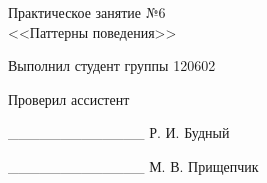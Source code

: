 \thispagestyle{empty}
\setlength{\parindent}{0ex} %

\begin{center}
  Практическое занятие №6 \\
  <<Паттерны поведения>>
\end{center}

\vspace{1\baselineskip}

\begin{minipage}{.5\linewidth}
    Выполнил студент группы 120602 

    \smallskip

    Проверил ассистент
\end{minipage}
\hfill
\begin{minipage}{.45\linewidth}
  \begin{flushright}
    \_\_\_\_\_\_\_\_\_\_\_\_\_ Р. И. Будный 

    \smallskip

    \_\_\_\_\_\_\_\_\_\_\_\_\_ М. В. Прищепчик 
  \end{flushright}
\end{minipage}

\setlength{\parindent}{1.25cm} %
